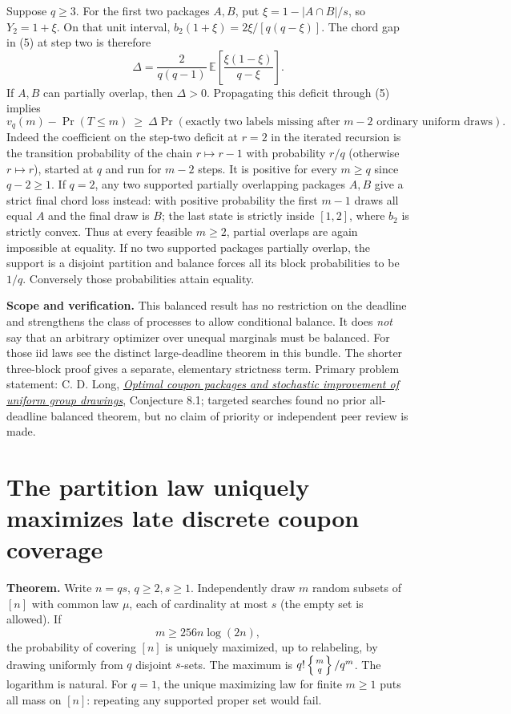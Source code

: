 \documentclass[10pt]{article}
\begin{document}
Suppose \(q\ge3\). For the first two packages \(A,B\), put
\(\xi=1-|A\cap B|/s\), so \(Y_2=1+\xi\). On that unit interval,
\(b_2(1+\xi)=2\xi/[q(q-\xi)]\). The chord gap in (5) at step two is
therefore \[
 \Delta=\frac{2}{q(q-1)}\,\mathbb E\!\left[\frac{\xi(1-\xi)}{q-\xi}\right].
\] If \(A,B\) can partially overlap, then \(\Delta>0\). Propagating this
deficit through (5) implies \[
 v_q(m)-\Pr(T\le m)\ \ge\ \Delta\Pr(\text{exactly two labels missing after }m-2
             \text{ ordinary uniform draws}).
\] Indeed the coefficient on the step-two deficit at \(r=2\) in the
iterated recursion is the transition probability of the chain
\(r\mapsto r-1\) with probability \(r/q\) (otherwise \(r\mapsto r\)),
started at \(q\) and run for \(m-2\) steps. It is positive for every
\(m\ge q\) since \(q-2\ge1\). If \(q=2\), any two supported partially
overlapping packages \(A,B\) give a strict final chord loss instead:
with positive probability the first \(m-1\) draws all equal \(A\) and
the final draw is \(B\); the last state is strictly inside \([1,2]\),
where \(b_2\) is strictly convex. Thus at every feasible \(m\ge2\),
partial overlaps are again impossible at equality. If no two supported
packages partially overlap, the support is a disjoint partition and
balance forces all its block probabilities to be \(1/q\). Conversely
those probabilities attain equality.

\textbf{Scope and verification.} This balanced result has no restriction
on the deadline and strengthens the class of processes to allow
conditional balance. It does \emph{not} say that an arbitrary optimizer
over unequal marginals must be balanced. For those iid laws see the
distinct large-deadline theorem in this bundle. The shorter three-block
proof gives a separate, elementary strictness term. Primary problem
statement: C. D. Long,
\href{https://hexagonmath.org/2611.00814v1}{\emph{Optimal coupon
packages and stochastic improvement of uniform group drawings}},
Conjecture 8.1; targeted searches found no prior all-deadline balanced
theorem, but no claim of priority or independent peer review is made.
\clearpage

\section*{The partition law uniquely maximizes late discrete coupon
coverage}\label{the-partition-law-uniquely-maximizes-late-discrete-coupon-coverage}

\textbf{Theorem.} Write \(n=qs\), \(q\ge2, s\ge1\). Independently draw
\(m\) random subsets of \([n]\) with common law \(\mu\), each of
cardinality at most \(s\) (the empty set is allowed). If \[
m\ge256n\log(2n),
\] the probability of covering \([n]\) is uniquely maximized, up to
relabeling, by drawing uniformly from \(q\) disjoint \(s\)-sets. The
maximum is \(q!\left\{\genfrac{}{}{0pt}{}{m}{q}\right\}/q^m\). The
logarithm is natural. For \(q=1\), the unique maximizing law for finite
\(m\ge1\) puts all mass on \([n]\): repeating any supported proper set
would fail.
\end{document}
